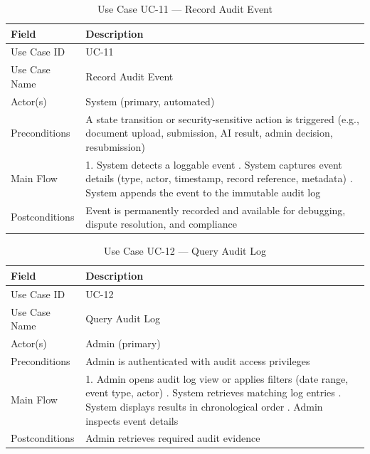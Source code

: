 \documentclass[a4paper,12pt]{report}
\renewcommand{\arraystretch}{1.25}
\begin{document}
\begin{table}[H]
\centering
\renewcommand{\arraystretch}{1.4}
\begin{tabularx}{\textwidth}{|l|X|}
\hline
\rowcolor{medgray}
\textbf{Field} & \textbf{Description} \\ \hline

Use Case ID & UC-11 \\ \hline
Use Case Name & Record Audit Event \\ \hline
Actor(s) & System (primary, automated) \\ \hline

Preconditions &
A state transition or security-sensitive action is triggered (e.g., document upload, submission, AI result, admin decision, resubmission) \\ \hline

Main Flow &
1. System detects a loggable event \newline
2. System captures event details (type, actor, timestamp, record reference, metadata) \newline
3. System appends the event to the immutable audit log \\ \hline

Postconditions &
Event is permanently recorded and available for debugging, dispute resolution, and compliance \\ \hline

\end{tabularx}
\caption{Use Case UC-11 — Record Audit Event}
\end{table}

\begin{table}[H]
\centering
\renewcommand{\arraystretch}{1.4}
\begin{tabularx}{\textwidth}{|l|X|}
\hline
\rowcolor{medgray}
\textbf{Field} & \textbf{Description} \\ \hline

Use Case ID & UC-12 \\ \hline
Use Case Name & Query Audit Log \\ \hline
Actor(s) & Admin (primary) \\ \hline

Preconditions & Admin is authenticated with audit access privileges \\ \hline

Main Flow &
1. Admin opens audit log view or applies filters (date range, event type, actor) \newline
2. System retrieves matching log entries \newline
3. System displays results in chronological order \newline
4. Admin inspects event details \\ \hline

Postconditions &
Admin retrieves required audit evidence \\ \hline

\end{tabularx}
\caption{Use Case UC-12 — Query Audit Log}
\end{table}
\end{document}
